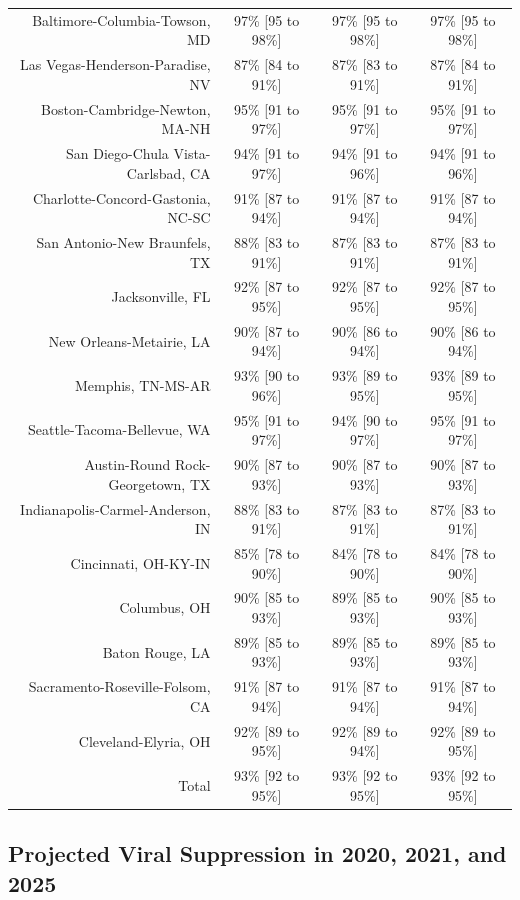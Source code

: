 \documentclass{article}
\begin{document}
\begin{table}[H]
\begin{tabular}{|r|c|c|c|}
		Baltimore-Columbia-Towson, MD & 97\% [95 to 98\%] & 97\% [95 to 98\%] & 97\% [95 to 98\%]\\
		Las Vegas-Henderson-Paradise, NV & 87\% [84 to 91\%] & 87\% [83 to 91\%] & 87\% [84 to 91\%]\\
		Boston-Cambridge-Newton, MA-NH & 95\% [91 to 97\%] & 95\% [91 to 97\%] & 95\% [91 to 97\%]\\
		San Diego-Chula Vista-Carlsbad, CA & 94\% [91 to 97\%] & 94\% [91 to 96\%] & 94\% [91 to 96\%]\\
		Charlotte-Concord-Gastonia, NC-SC & 91\% [87 to 94\%] & 91\% [87 to 94\%] & 91\% [87 to 94\%]\\
		San Antonio-New Braunfels, TX & 88\% [83 to 91\%] & 87\% [83 to 91\%] & 87\% [83 to 91\%]\\
		Jacksonville, FL & 92\% [87 to 95\%] & 92\% [87 to 95\%] & 92\% [87 to 95\%]\\
		New Orleans-Metairie, LA & 90\% [87 to 94\%] & 90\% [86 to 94\%] & 90\% [86 to 94\%]\\
		Memphis, TN-MS-AR & 93\% [90 to 96\%] & 93\% [89 to 95\%] & 93\% [89 to 95\%]\\
		Seattle-Tacoma-Bellevue, WA & 95\% [91 to 97\%] & 94\% [90 to 97\%] & 95\% [91 to 97\%]\\
		Austin-Round Rock-Georgetown, TX & 90\% [87 to 93\%] & 90\% [87 to 93\%] & 90\% [87 to 93\%]\\
		Indianapolis-Carmel-Anderson, IN & 88\% [83 to 91\%] & 87\% [83 to 91\%] & 87\% [83 to 91\%]\\
		Cincinnati, OH-KY-IN & 85\% [78 to 90\%] & 84\% [78 to 90\%] & 84\% [78 to 90\%]\\
		Columbus, OH & 90\% [85 to 93\%] & 89\% [85 to 93\%] & 90\% [85 to 93\%]\\
		Baton Rouge, LA & 89\% [85 to 93\%] & 89\% [85 to 93\%] & 89\% [85 to 93\%]\\
		Sacramento-Roseville-Folsom, CA & 91\% [87 to 94\%] & 91\% [87 to 94\%] & 91\% [87 to 94\%]\\
		Cleveland-Elyria, OH & 92\% [89 to 95\%] & 92\% [89 to 94\%] & 92\% [89 to 95\%]\\
		\hline
		Total & 93\% [92 to 95\%] & 93\% [92 to 95\%] & 93\% [92 to 95\%]\\
		\hline
	\end{tabular}
\end{table}


\subsection{Projected Viral Suppression in 2020, 2021, and 2025}
\end{document}
